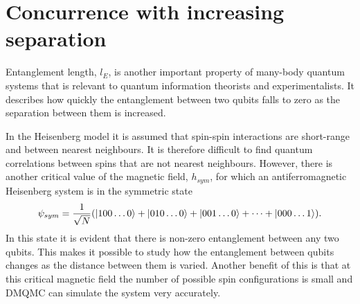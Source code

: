 \section{Concurrence with increasing separation}
Entanglement length\cite{Arnesen2001}, $l_E$, is another important property of many-body quantum systems that is relevant to quantum information theorists and experimentalists. It describes how quickly the entanglement between two qubits falls to zero as the separation between them is increased. 

In the Heisenberg model it is assumed that spin-spin interactions are short-range and between nearest neighbours. It is therefore difficult to find quantum correlations between spins that are not nearest neighbours. However, there is another critical value of the magnetic field, $h_{sym}$, for which an antiferromagnetic Heisenberg system is in the symmetric state
\begin{equation}
\psi_{sym} = \frac{1}{\sqrt{N}}(\ket{100\dots0} + \ket{010\dots0} + \ket{001\dots0} + \dots + \ket{000\dots1}).
\end{equation}
In this state it is evident that there is non-zero entanglement between any two qubits. This makes it possible to study how the entanglement between qubits changes as the distance between them is varied. Another benefit of this is that at this critical magnetic field the number of possible spin configurations is small and DMQMC can simulate the system very accurately.


